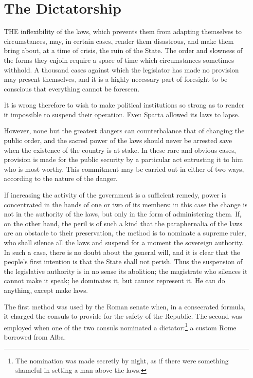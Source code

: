 \documentclass[12pt]{book}
\begin{document}
\section{The Dictatorship}
THE inflexibility of the laws, which prevents them from adapting themselves to circumstances, may, in certain cases, render them disastrous, and make them bring about, at a time of crisis, the ruin of the State. The order and slowness of the forms they enjoin require a space of time which circumstances sometimes withhold. A thousand cases against which the legislator has made no provision may present themselves, and it is a highly necessary part of foresight to be conscious that everything cannot be foreseen.

It is wrong therefore to wish to make political institutions so strong as to render it impossible to suspend their operation. Even Sparta allowed its laws to lapse.

However, none but the greatest dangers can counterbalance that of changing the public order, and the sacred power of the laws should never be arrested save when the existence of the country is at stake. In these rare and obvious cases, provision is made for the public security by a particular act entrusting it to him who is most worthy. This commitment may be carried out in either of two ways, according to the nature of the danger.

If increasing the activity of the government is a sufficient remedy, power is concentrated in the hands of one or two of its members: in this case the change is not in the authority of the laws, but only in the form of administering them. If, on the other hand, the peril is of such a kind that the paraphernalia of the laws are an obstacle to their preservation, the method is to nominate a supreme ruler, who shall silence all the laws and suspend for a moment the sovereign authority. In such a case, there is no doubt about the general will, and it is clear that the people's first intention is that the State shall not perish. Thus the suspension of the legislative authority is in no sense its abolition; the magistrate who silences it cannot make it speak; he dominates it, but cannot represent it. He can do anything, except make laws.

The first method was used by the Roman senate when, in a consecrated formula, it charged the consuls to provide for the safety of the Republic. The second was employed when one of the two consuls nominated a dictator:\footnote{The nomination was made secretly by night, as if there were something shameful in setting a man above the laws.} a custom Rome borrowed from Alba.
\end{document}
